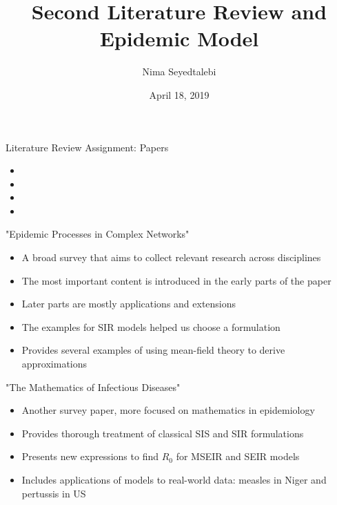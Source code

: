 \documentclass{beamer}
\title{Second Literature Review and Epidemic Model}
\author{Nima Seyedtalebi}
\date{April 18, 2019}
\begin{document}
\begin{frame}
    \maketitle
\end{frame}

\begin{frame}{Literature Review Assignment: Papers}
\begin{itemize}
    \item {}
    \item {}
    \item {}
    \item {}
\end{itemize}
\end{frame}

\begin{frame}{"Epidemic Processes in Complex Networks"}
\begin{itemize}
    \item A broad survey that aims to collect relevant research across disciplines
    \item The most important content is introduced in the early parts of the paper
    \item Later parts are mostly applications and extensions
    \item The examples for SIR models helped us choose a formulation
    \item Provides several examples of using mean-field theory to derive approximations
\end{itemize}
\end{frame}

\begin{frame}{"The Mathematics of Infectious Diseases"}
\begin{itemize}
    \item Another survey paper, more focused on mathematics in epidemiology
    \item Provides thorough treatment of classical SIS and SIR formulations
    \item Presents new expressions to find $R_{0}$ for MSEIR and SEIR models
    \item Includes applications of models to real-world data: measles in Niger and pertussis in US
\end{itemize}    
\end{frame}
\end{document}
